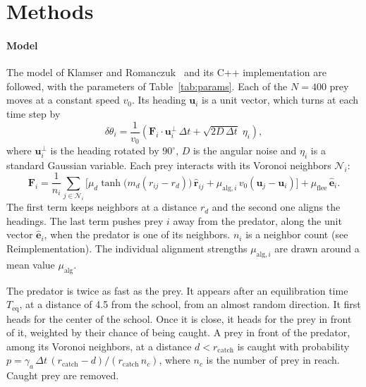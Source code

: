 \documentclass[9pt,twoside]{pnas-new}
\begin{document}
\section*{Methods}

\paragraph*{Model}
The model of Klamser and Romanczuk~\cite{klamser2021} and its C++ implementation are followed, with the
parameters of Table~\ref{tab:params}. Each of the $N = 400$ prey moves at a constant speed $v_0$. Its
heading $\mathbf{u}_i$ is a unit vector, which turns at each time step by
\begin{equation}
\delta\theta_i = \frac{1}{v_0}\left(\mathbf{F}_i \cdot \mathbf{u}_i^{\perp}\,\Delta t
+ \sqrt{2D\,\Delta t}\;\eta_i\right),
\label{eq:turn}
\end{equation}
where $\mathbf{u}_i^{\perp}$ is the heading rotated by $90^\circ$, $D$ is the angular noise and
$\eta_i$ is a standard Gaussian variable. Each prey interacts with its Voronoi neighbors
$\mathcal{N}_i$:
\begin{equation}
\mathbf{F}_i = \frac{1}{n_i}\sum_{j \in \mathcal{N}_i}\Big[\mu_d \tanh\!\big(m_d(r_{ij} - r_d)\big)\,
\hat{\mathbf{r}}_{ij} + \mu_{\mathrm{alg},i}\,v_0(\mathbf{u}_j - \mathbf{u}_i)\Big]
+ \mu_{\mathrm{flee}}\,\hat{\mathbf{e}}_{i}.
\label{eq:force}
\end{equation}
The first term keeps neighbors at a distance $r_d$ and the second one aligns the headings. The last
term pushes prey $i$ away from the predator, along the unit vector $\hat{\mathbf{e}}_i$, when the
predator is one of its neighbors. $n_i$ is a neighbor count (see Reimplementation). The individual
alignment strengths $\mu_{\mathrm{alg},i}$ are drawn around a mean value $\mu_{\mathrm{alg}}$.

The predator is twice as fast as the prey. It appears after an equilibration time $T_{\mathrm{eq}}$, at a distance of 4.5 from the school, from an almost random direction. It first heads for the center of the school. Once it is close, it heads for the prey in front of it,
weighted by their chance of being caught. A prey in front of the predator, among its Voronoi neighbors, at a distance
$d < r_{\mathrm{catch}}$ is caught
with probability $p = \gamma_a\,\Delta t\,(r_{\mathrm{catch}} - d)/(r_{\mathrm{catch}}\,n_c)$, where
$n_c$ is the number of prey in reach. Caught prey are removed.
\end{document}
